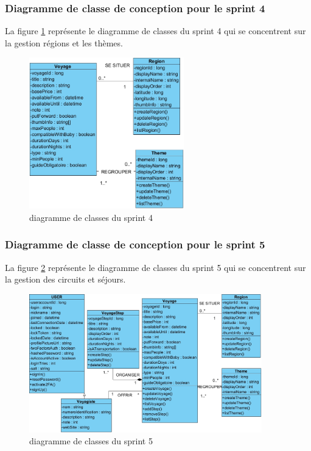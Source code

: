 \documentclass[12pt]{report}
\begin{document}
			\subsubsection{Diagramme de classe de conception pour le sprint 4}
				
			\hspace{15pt} La figure \ref{fig:sprint4} représente le diagramme de classes du sprint 4 qui se concentrent sur la gestion régions
et les thèmes.


			\begin{figure}[h]
				\centering
				\includegraphics[width=0.6\textwidth]{sprint4.jpg}
				\caption{diagramme de classes du sprint 4}
				\label{fig:sprint4}
			\end{figure}
			\FloatBarrier

			\subsubsection{Diagramme de classe de conception pour le sprint 5}
				
			\hspace{15pt} La figure \ref{fig:sprint5} représente le diagramme de classes du sprint 5 qui se concentrent sur la gestion des circuits
et séjours.


			\begin{figure}[h]
				\centering
				\includegraphics[width=0.9\textwidth]{sprint5.jpg}
				\caption{diagramme de classes du sprint 5}
				\label{fig:sprint5}
			\end{figure}
			\FloatBarrier
\end{document}
